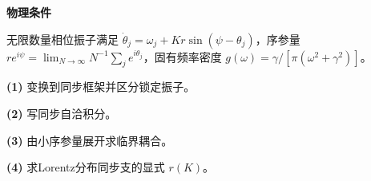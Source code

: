 \textbf{物理条件}\par 无限数量相位振子满足 \(\dot\theta_j=\omega_j+K r\sin(\psi-\theta_j)\)，序参量 \(re^{i\psi}=\lim_{N\to\infty}N^{-1}\sum_je^{i\theta_j}\)，固有频率密度 \(g(\omega)=\gamma/[\pi(\omega^2+\gamma^2)]\)。
\par\noindent\textbf{(1)} 变换到同步框架并区分锁定振子。
\par\noindent\textbf{(2)} 写同步自洽积分。
\par\noindent\textbf{(3)} 由小序参量展开求临界耦合。
\par\noindent\textbf{(4)} 求Lorentz分布同步支的显式 \(r(K)\)。
